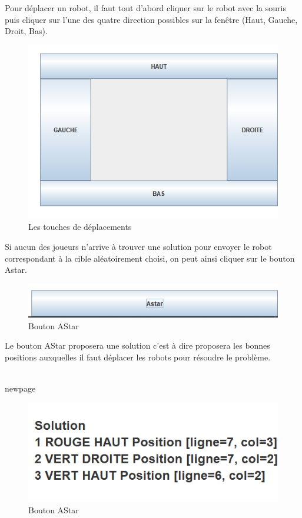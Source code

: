 \documentclass[12pt]{article}
\begin{document}
		\newpage
			Pour déplacer un robot, il faut tout d'abord cliquer sur le robot avec la souris puis cliquer sur l'une des quatre direction possibles sur la fenêtre (Haut, Gauche, Droit, Bas).
		
		\begin{figure}[htp]
			\includegraphics[scale=0.6]{./images/btnControl.png}
			\caption{Les touches de déplacements}
		\end{figure}	
			
			Si aucun des joueurs n'arrive à trouver une solution pour envoyer le robot correspondant à la cible aléatoirement choisi, on peut ainsi cliquer sur le bouton Astar.
			
			\begin{figure}[htpb]
				\includegraphics[scale=0.6]{./images/btnAstar.png}
				\caption{Bouton AStar}
			\end{figure}
			
				Le bouton AStar proposera une solution c'est à dire proposera les bonnes positions auxquelles il faut déplacer les robots pour résoudre le problème.
		
		
			\\newpage
			\begin{figure}[htpb]
				\includegraphics[scale=0.6]{./images/solutionAEtoil.png}
				\caption{Bouton AStar}
			\end{figure}
			
\end{document}
